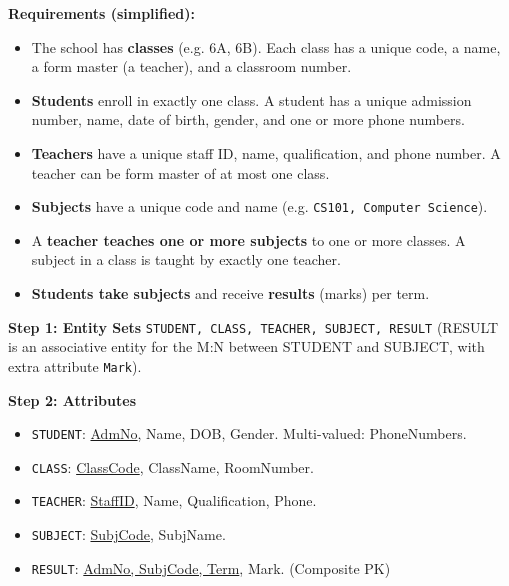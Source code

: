 \documentclass[11pt]{article}
\begin{document}
\textbf{Requirements (simplified):}
\begin{itemize}
    \item The school has \textbf{classes} (e.g. 6A, 6B). Each class has a unique code, a name, a form master (a teacher), and a classroom number.
    \item \textbf{Students} enroll in exactly one class. A student has a unique admission number, name, date of birth, gender, and one or more phone numbers.
    \item \textbf{Teachers} have a unique staff ID, name, qualification, and phone number. A teacher can be form master of at most one class.
    \item \textbf{Subjects} have a unique code and name (e.g. \texttt{CS101, Computer Science}).
    \item A \textbf{teacher teaches one or more subjects} to one or more classes. A subject in a class is taught by exactly one teacher.
    \item \textbf{Students take subjects} and receive \textbf{results} (marks) per term.
\end{itemize}

\textbf{Step 1: Entity Sets}
\texttt{STUDENT, CLASS, TEACHER, SUBJECT, RESULT} (RESULT is an associative entity for the M:N between STUDENT and SUBJECT, with extra attribute \texttt{Mark}).

\textbf{Step 2: Attributes}
\begin{itemize}
    \item \texttt{STUDENT}: \underline{AdmNo}, Name, DOB, Gender. Multi-valued: PhoneNumbers.
    \item \texttt{CLASS}: \underline{ClassCode}, ClassName, RoomNumber.
    \item \texttt{TEACHER}: \underline{StaffID}, Name, Qualification, Phone.
    \item \texttt{SUBJECT}: \underline{SubjCode}, SubjName.
    \item \texttt{RESULT}: \underline{AdmNo, SubjCode, Term}, Mark. (Composite PK)
\end{itemize}
\end{document}
